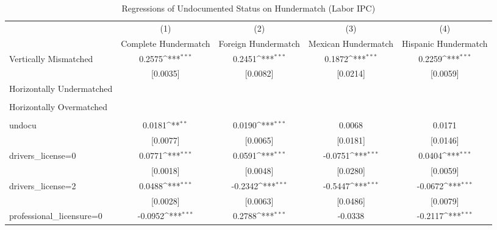 \begin{table}[htbp]\centering
\def\sym#1{\ifmmode^{#1}\else\(^{#1}\)\fi}
\caption{Regressions of Undocumented Status on Hundermatch (Labor IPC)}
\begin{tabular}{l*{4}{c}}
\toprule
                    &\multicolumn{1}{c}{(1)}         &\multicolumn{1}{c}{(2)}         &\multicolumn{1}{c}{(3)}         &\multicolumn{1}{c}{(4)}         \\
                    &Complete Hundermatch         &Foreign Hundermatch         &Mexican Hundermatch         &Hispanic Hundermatch         \\
\midrule
Vertically Mismatched&      0.2575\sym{***}&      0.2451\sym{***}&      0.1872\sym{***}&      0.2259\sym{***}\\
                    &    [0.0035]         &    [0.0082]         &    [0.0214]         &    [0.0059]         \\
\addlinespace
Horizontally Undermatched&                     &                     &                     &                     \\
                    &                     &                     &                     &                     \\
\addlinespace
Horizontally Overmatched&                     &                     &                     &                     \\
                    &                     &                     &                     &                     \\
\addlinespace
undocu              &      0.0181\sym{**} &      0.0190\sym{***}&      0.0068         &      0.0171         \\
                    &    [0.0077]         &    [0.0065]         &    [0.0181]         &    [0.0146]         \\
\addlinespace
drivers\_license=0   &      0.0771\sym{***}&      0.0591\sym{***}&     -0.0751\sym{***}&      0.0404\sym{***}\\
                    &    [0.0018]         &    [0.0048]         &    [0.0280]         &    [0.0059]         \\
\addlinespace
drivers\_license=2   &      0.0488\sym{***}&     -0.2342\sym{***}&     -0.5447\sym{***}&     -0.0672\sym{***}\\
                    &    [0.0028]         &    [0.0063]         &    [0.0486]         &    [0.0079]         \\
\addlinespace
professional\_licensure=0&     -0.0952\sym{***}&      0.2788\sym{***}&     -0.0338         &     -0.2117\sym{***}\\

\end{tabular}
\end{table}
